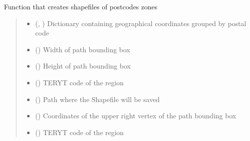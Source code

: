 \documentclass[letterpaper,10pt,english]{sphinxmanual}
\begin{document}

\begin{fulllineitems}
\label{\detokenize{pcm_utilities:pcm_utilities.create_pc_shps}}
\pysigstartsignatures
{}
\pysigstopsignatures
\sphinxAtStartPar
Function that creates shapefiles of postcodes zones
\begin{quote}\begin{description}
\begin{itemize}
\item {} 
\sphinxAtStartPar
{} (\sphinxcode{\sphinxupquote{Dict}}{[}, \sphinxcode{\sphinxupquote{ndarray}}{]}) \textendash{} Dictionary containing geographical coordinates grouped by postal code

\item {} 
\sphinxAtStartPar
{} () \textendash{} Width of path bounding box

\item {} 
\sphinxAtStartPar
{} () \textendash{} Height of path bounding box

\item {} 
\sphinxAtStartPar
{} () \textendash{} TERYT code of the region

\item {} 
\sphinxAtStartPar
{} () \textendash{} Path where the Shapefile will be saved

\item {} 
\sphinxAtStartPar
{} () \textendash{} Coordinates of the upper right vertex of the path bounding box

\item {} 
\sphinxAtStartPar
{} () \textendash{} TERYT code of the region


\end{itemize}
\end{description}
\end{quote}
\end{fulllineitems}
\end{document}
